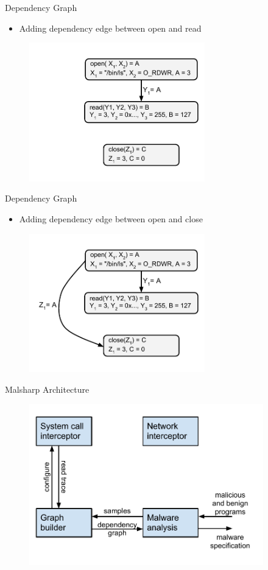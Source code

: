 \documentclass{beamer}
\begin{document}
\begin{frame}{Dependency Graph}
  \begin{itemize}
    \item Adding dependency edge between open and read
  \end{itemize}
  \begin{figure}[p]
    \includegraphics[width=3in]{img/syscall-dep-graph-1.pdf}
    \end{figure}
\end{frame}

\begin{frame}{Dependency Graph}
  \begin{itemize}
    \item Adding dependency edge between open and close
  \end{itemize}
  \begin{figure}[p]
    \includegraphics[width=3in]{img/syscall-dep-graph-2.pdf}
    \end{figure}
\end{frame}

\begin{frame}{Malsharp Architecture}
  \begin{figure}[p]
    \includegraphics[width=4in]{img/mal-sharp-architecture.pdf}
    \end{figure}
\end{frame}
\end{document}

